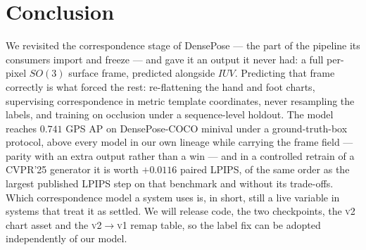 \section{Conclusion}
\label{sec:conclusion}

We revisited the correspondence stage of DensePose --- the part of the pipeline its consumers
import and freeze --- and gave it an output it never had: a full per-pixel $SO(3)$ surface frame,
predicted alongside $IUV$. Predicting that frame correctly is what forced the rest: re-flattening
the hand and foot charts, supervising correspondence in metric template coordinates, never
resampling the labels, and training on occlusion under a sequence-level holdout. The model reaches
$0.741$ GPS AP on DensePose-COCO minival under a ground-truth-box protocol, above every model in
our own lineage while carrying the frame field --- parity with an extra output rather than a win
--- and in a controlled retrain of a CVPR'25 generator it is worth $+0.0116$ paired LPIPS, of the
same order as the largest published LPIPS step on that benchmark and without its trade-offs. Which
correspondence model a system uses is, in short, still a live variable in systems that treat it as
settled. We will release code, the two checkpoints, the \textsc{v2} chart asset and the
\textsc{v2}$\rightarrow$\textsc{v1} remap table, so the label fix can be adopted independently of
our model.

